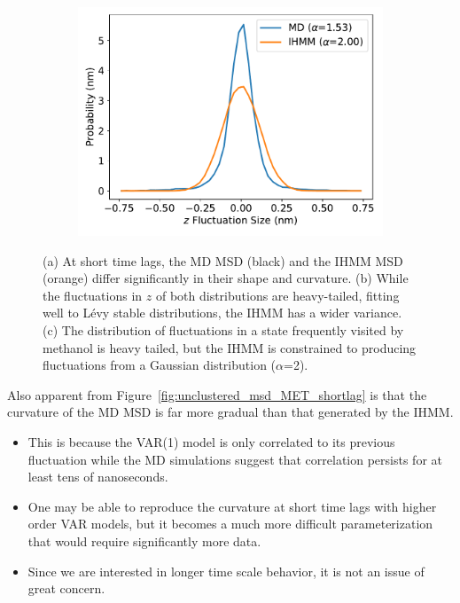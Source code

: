 \documentclass[journal=jpcbfk,manuscript=article]{achemso}
\begin{document}
\begin{figure}
\begin{subfigure}{0.32\textwidth}
  \includegraphics[width=\textwidth]{state_emission_widths.pdf}
  \caption{}\label{fig:state_emission_widths}
  \end{subfigure}
  \caption{(a) At short time lags, the MD MSD (black) and the IHMM MSD (orange)
  differ significantly in their shape and curvature. (b) While the 
  fluctuations in $z$ of both distributions are heavy-tailed, fitting well to L\'evy
  stable distributions, the IHMM has a wider variance. (c) The distribution of 
  fluctuations in a state frequently visited by methanol is heavy tailed, but the 
  IHMM is constrained to producing fluctuations from a Gaussian distribution ($\alpha$=2).
  }\label{fig:short_timelags}
  \end{figure}
  
  Also apparent from Figure~\ref{fig:unclustered_msd_MET_shortlag} is that the 
  curvature of the MD MSD is far more gradual than that generated by the IHMM.
  \begin{itemize}
    \item This is because the VAR(1) model is only correlated to its previous
    fluctuation while the MD simulations suggest that correlation persists for
    at least tens of nanoseconds.
    \item One may be able to reproduce the curvature at short time lags with
    higher order VAR models, but it becomes a much more difficult parameterization
    that would require significantly more data.
    \item Since we are interested in longer time scale behavior, it is not an 
    issue of great concern.
  \end{itemize}
  
\end{document}
